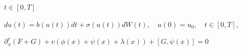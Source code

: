 \documentclass{article}
\begin{document}
$t\in[0,T]$

$du(t)=b(u(t))dt+\sigma(u(t))dW(t),\quad u(0)=u_{0},\quad t\in[0,T],$

$\partial^{r}_{x}(F+G)+v(\phi(x)+\psi(x)+\lambda(x))+[G,\psi(x)]=0$
\end{document}
